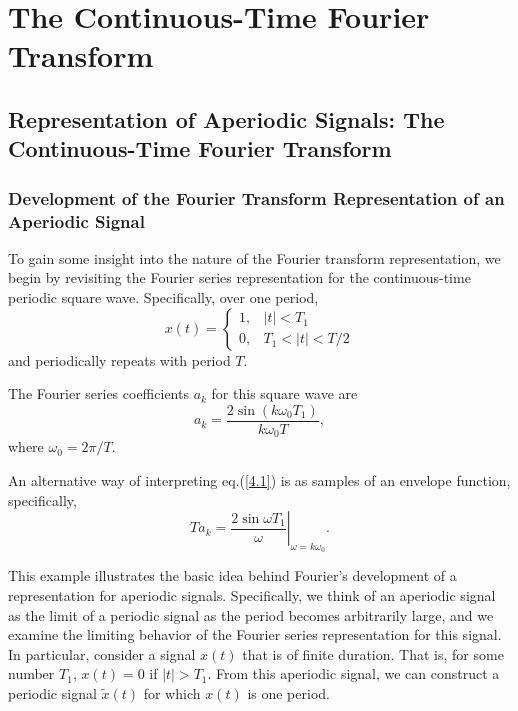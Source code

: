 \documentclass[a4paper,twoside]{book}
\begin{document}
\chapter{The Continuous-Time Fourier Transform}
\section{Representation of Aperiodic Signals: The Continuous-Time Fourier Transform}
\label{section:4.1}

\subsection{Development of the Fourier Transform Representation of an Aperiodic Signal}

To gain some insight into the nature of the Fourier transform representation, we begin by revisiting the Fourier series representation for the continuous-time periodic square wave. Specifically, over one period, $$\left.x(t) = \left\{\begin{array}{ll}1,&|t|<T_1\\0,&T_1<|t|<T/2\end{array}\right.\right.$$ and periodically repeats with period $T$.

The Fourier series coefficients $a_k$ for this square wave are
\begin{equation}
    a_k=\frac{2\sin(k\omega_0T_1)}{k\omega_0T},
    \label{4.1}
\end{equation}
where $\omega_0=2\pi/T$.

An alternative way of interpreting eq.\;(\ref{4.1}) is as samples of an envelope function, specifically,
\begin{equation}
    Ta_k=\left.\frac{2\sin\omega T_1}\omega\right|_{\omega=k\omega_0}.
    \label{4.2}
\end{equation}

This example illustrates the basic idea behind Fourier's development of a representation for aperiodic signals. Specifically, we think of an aperiodic signal as the limit of a periodic signal as the period becomes arbitrarily large, and we examine the limiting behavior of the Fourier series representation for this signal. In particular, consider a signal $x(t)$ that is of finite duration. That is, for some number $T_1$, $x(t)=0$ if $|t|>T_1$. From this aperiodic signal, we can construct a periodic signal $\tilde{x}(t)$ for which $x(t)$ is one period.
\end{document}
